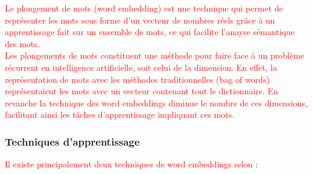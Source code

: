      \textcolor{red}{Le plongement de mots (word embedding) est une technique qui permet de représenter les mots sous forme d'un vecteur de nombres réels grâce à un apprentissage fait sur un ensemble de mots, ce qui facilite l'anayse sémantique des mots.\\
    Les plongements de mots constituent une méthode pour faire face à un problème récurrent en intelligence artificielle, soit celui de la dimension. En effet, la représentation de mots avec les méthodes traditionnelles (bag of words) représentaient les mots avec un vecteur contenant tout le dictionnaire. En revanche la technique des word embeddings diminue le nombre de ces dimensions, facilitant ainsi les tâches d'apprentissage impliquant ces mots.}
    
    
    \subsubsection{Techniques d'apprentissage}
    
     \textcolor{red}{Il existe principalement deux techniques de word embeddings selon \cite{we1}} :
    
